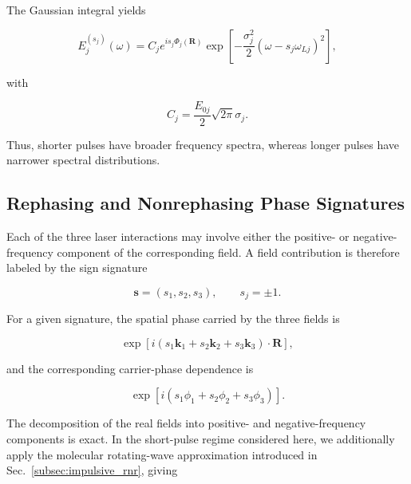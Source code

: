 \documentclass[11pt]{article}
\begin{document}
The Gaussian integral yields

\begin{equation}
\boxed{
E_j^{(s_j)}(\omega)
=
C_j
e^{is_j\Phi_j(\mathbf{R})}
\exp\left[
-\frac{\sigma_j^2}{2}
\left(
\omega-s_j\omega_{Lj}
\right)^2
\right],
}
\label{eq:gaussian_laser_spectrum}
\end{equation}

with

\begin{equation}
\boxed{
C_j
=
\frac{E_{0j}}{2}
\sqrt{2\pi}\sigma_j.
}
\label{eq:laser_prefactor}
\end{equation}

Thus, shorter pulses have broader frequency spectra, whereas longer
pulses have narrower spectral distributions.


\subsection{Rephasing and Nonrephasing Phase Signatures}
\label{subsec:phase_signatures}

Each of the three laser interactions may involve either the positive-
or negative-frequency component of the corresponding field. A field
contribution is therefore labeled by the sign signature

\begin{equation}
\mathbf{s}
=
(s_1,s_2,s_3),
\qquad
s_j=\pm1.
\end{equation}

For a given signature, the spatial phase carried by the three fields is

\begin{equation}
\exp
\left[
i
\left(
s_1\mathbf{k}_1
+
s_2\mathbf{k}_2
+
s_3\mathbf{k}_3
\right)
\cdot\mathbf{R}
\right],
\end{equation}

and the corresponding carrier-phase dependence is

\begin{equation}
\exp
\left[
i
\left(
s_1\phi_1
+
s_2\phi_2
+
s_3\phi_3
\right)
\right].
\end{equation}

The decomposition of the real fields into positive- and
negative-frequency components is exact. In the short-pulse regime
considered here, we additionally apply the molecular rotating-wave
approximation introduced in Sec.~\ref{subsec:impulsive_rnr}, giving
\end{document}
